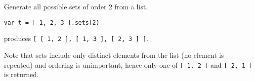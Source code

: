 Generate all possible sets of order 2 from a list.

\begin{lstlisting}
var t = [ 1, 2, 3 ].sets(2)
\end{lstlisting}

produces
\texttt{{[}\ {[}\ 1,\ 2\ {]},\ {[}\ 1,\ 3\ {]},\ {[}\ 2,\ 3\ {]}\ {]}}.

Note that sets include only distinct elements from the list (no element
is repeated) and ordering is unimportant, hence only one of
\texttt{{[}\ 1,\ 2\ {]}} and \texttt{{[}\ 2,\ 1\ {]}} is returned.
